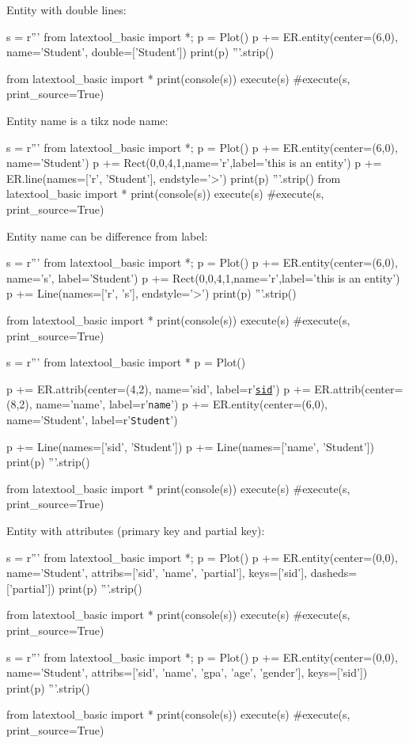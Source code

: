 Entity with double lines:
\begin{python}
s = r'''
from latextool_basic import *; p = Plot()
p += ER.entity(center=(6,0), name='Student', double=['Student'])
print(p)
'''.strip()

from latextool_basic import *
print(console(s))
execute(s)
#execute(s, print_source=True)
\end{python}

Entity name is a tikz node name:
\begin{python}
s = r'''
from latextool_basic import *; p = Plot()
p += ER.entity(center=(6,0), name='Student')
p += Rect(0,0,4,1,name='r',label='this is an entity')
p += ER.line(names=['r', 'Student'], endstyle='>')
print(p)
'''.strip()
from latextool_basic import *
print(console(s))
execute(s)
#execute(s, print_source=True)
\end{python}

Entity name can be difference from label:
\begin{python}
s = r'''
from latextool_basic import *; p = Plot()
p += ER.entity(center=(6,0), name='s', label='Student')
p += Rect(0,0,4,1,name='r',label='this is an entity')
p += Line(names=['r', 's'], endstyle='>')
print(p)
'''.strip()

from latextool_basic import *
print(console(s))
execute(s)
#execute(s, print_source=True)
\end{python}

\newpage
\begin{python}
s = r'''
from latextool_basic import *
p = Plot()

p += ER.attrib(center=(4,2), name='sid', label=r'\texttt{\underline{sid}}')
p += ER.attrib(center=(8,2), name='name', label=r'\texttt{name}')
p += ER.entity(center=(6,0), name='Student', label=r'\texttt{Student}')

p += Line(names=['sid', 'Student'])
p += Line(names=['name', 'Student'])
print(p)
'''.strip()

from latextool_basic import *
print(console(s))
execute(s)
#execute(s, print_source=True)
\end{python}

\newpage
Entity with attributes (primary key and partial key):
\begin{python}
s = r'''
from latextool_basic import *; p = Plot()
p += ER.entity(center=(0,0),
          name='Student',
          attribs=['sid', 'name', 'partial'], keys=['sid'], dasheds=['partial'])
print(p)
'''.strip()

from latextool_basic import *
print(console(s))
execute(s)
#execute(s, print_source=True)
\end{python}
\begin{python}
s = r'''
from latextool_basic import *; p = Plot()
p += ER.entity(center=(0,0),
          name='Student',
          attribs=['sid', 'name', 'gpa', 'age', 'gender'],
          keys=['sid'])
print(p)
'''.strip()

from latextool_basic import *
print(console(s))
execute(s)
#execute(s, print_source=True)
\end{python}


